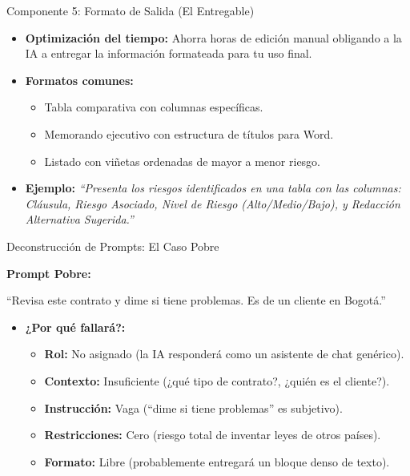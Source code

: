 \documentclass[aspectratio=169]{beamer}
\begin{document}
\begin{frame}[fragile]{Componente 5: Formato de Salida (El Entregable)}


\begin{itemize}
  \item \textbf{Optimización del tiempo:} Ahorra horas de edición manual obligando a la IA a entregar la información formateada para tu uso final.
  \item \textbf{Formatos comunes:}
  \begin{itemize}
    \item Tabla comparativa con columnas específicas.
    \item Memorando ejecutivo con estructura de títulos para Word.
    \item Listado con viñetas ordenadas de mayor a menor riesgo.
  \end{itemize}
  \item \textbf{Ejemplo:} \textit{``Presenta los riesgos identificados en una tabla con las columnas: Cláusula, Riesgo Asociado, Nivel de Riesgo (Alto/Medio/Bajo), y Redacción Alternativa Sugerida.''}
\end{itemize}
\end{frame}



\begin{frame}[fragile]{Deconstrucción de Prompts: El Caso Pobre}


\textbf{Prompt Pobre:}

``Revisa este contrato y dime si tiene problemas. Es de un cliente en Bogotá.''

\begin{itemize}
  \item \textbf{¿Por qué fallará?:}
  \begin{itemize}
    \item \textbf{Rol:} No asignado (la IA responderá como un asistente de chat genérico).
    \item \textbf{Contexto:} Insuficiente (¿qué tipo de contrato?, ¿quién es el cliente?).
    \item \textbf{Instrucción:} Vaga (``dime si tiene problemas'' es subjetivo).
    \item \textbf{Restricciones:} Cero (riesgo total de inventar leyes de otros países).
    \item \textbf{Formato:} Libre (probablemente entregará un bloque denso de texto).
  \end{itemize}
\end{itemize}
\end{frame}
\end{document}
